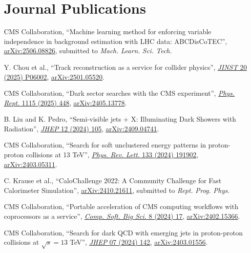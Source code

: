\section{Journal Publications}
\begin{description}[leftmargin=12pt,font=\normalfont,labelsep=0em]
\item CMS Collaboration, ``Machine learning method for enforcing variable independence in background estimation with LHC data: ABCDisCoTEC'', \href{https://arxiv.org/abs/2506.08826}{arXiv:2506.08826}, submitted to \emph{Mach. Learn. Sci. Tech.} %
\item Y. Chou et al., ``Track reconstruction as a service for collider physics'', \href{https://doi.org/10.1088/1748-0221/20/06/P06002}{\emph{JINST} 20 (2025) P06002}, \href{https://arxiv.org/abs/2501.05520}{arXiv:2501.05520}. %
\item CMS Collaboration, ``Dark sector searches with the CMS experiment'', \href{https://doi.org/10.1016/j.physrep.2024.09.013}{\emph{Phys. Rept.} 1115 (2025) 448}, \href{https://arxiv.org/abs/2405.13778}{arXiv:2405.13778}. %
\item \begin{sloppypar}B. Liu and K. Pedro, ``Semi-visible jets + X: Illuminating Dark Showers with Radiation'', \href{https://doi.org/10.1007/JHEP12(2024)105}{\emph{JHEP} 12 (2024) 105}, \href{https://arxiv.org/abs/2409.04741}{arXiv:2409.04741}.\end{sloppypar} %
\item CMS Collaboration, ``Search for soft unclustered energy patterns in proton-proton collisions at 13 TeV'', \href{http://dx.doi.org/10.1103/PhysRevLett.133.191902}{\emph{Phys. Rev. Lett.} 133 (2024) 191902}, \href{https://arxiv.org/abs/2403.05311}{arXiv:2403.05311}. %
\item C. Krause et al., ``CaloChallenge 2022: A Community Challenge for Fast Calorimeter Simulation'', \href{https://arxiv.org/abs/2410.21611}{arXiv:2410.21611}, submitted to \emph{Rept. Prog. Phys.} %
\item CMS Collaboration, ``Portable acceleration of CMS computing workflows with coprocessors as a service'', \href{https://doi.org/10.1007/s41781-024-00124-1}{\emph{Comp. Soft. Big Sci.} 8 (2024) 17}, \href{https://arxiv.org/abs/2402.15366}{arXiv:2402.15366}. %
\item CMS Collaboration, ``Search for dark QCD with emerging jets in proton-proton collisions at $\sqrt{s} = 13$ TeV'', \href{https://doi.org/10.1007/JHEP07(2024)142}{\emph{JHEP} 07 (2024) 142}, \href{https://arxiv.org/abs/2403.01556}{arXiv:2403.01556}. %

\end{description}
